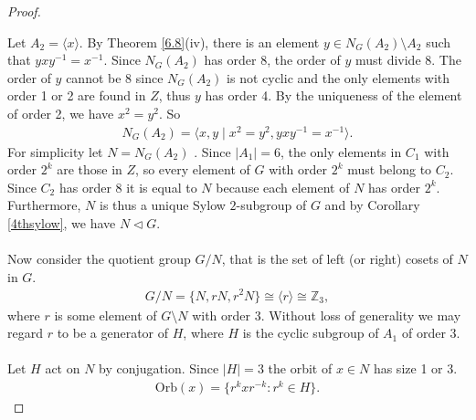 \documentclass[a4paper , 11pt]{book}
\theoremstyle{definition}
\theoremstyle{remark}
\begin{document}
\begin{proof}
\begin{center}
\end{center}

Let $A_2 = \langle x \rangle$. By Theorem \ref{6.8}(iv), there is an element $y \in N_G(A_2) \! \setminus \! A_2$ such that $y x y^{-1} = x^{-1}$. Since $N_G(A_2)$ has order 8, the order of $y$ must divide 8. The order of $y$ cannot be 8 since $N_G(A_2)$ is not cyclic and the only elements with order 1 or 2  are found in $Z$, thus $y$ has order 4. By the uniqueness of the element of order 2, we have $x^2 = y^2$. So
\begin{align*} N_G(A_2) = \langle x, y \; | \; x^2 = y^2, y x y^{-1} = x^{-1} \rangle.
\end{align*}
For simplicity let $N = N_G(A_2)$ . Since $|A_1| = 6$, the only elements in $C_1$ with order $2^k$ are those in $Z$, so every element of $G$ with order $2^k$ must belong to $C_2$. Since $C_2$ has order 8 it is equal to $N$ because each element of $N$ has order $2^k$. Furthermore, $N$ is thus a unique Sylow $2$-subgroup of $G$ and by Corollary \ref{4thsylow}, we have $N \vartriangleleft G$. \\
\\
Now consider the quotient group $G / N$, that is the set of left (or right) cosets of $N$ in $G$.
\begin {align*} G / N = \{ N, rN, r^2N \} \cong \langle r \rangle \cong \mathbb{Z}_3,
\end{align*}
where $r$ is some element of $G\! \setminus \! N$ with order 3. Without loss of generality we may regard $r$ to be a generator of $H$, where $H$ is the cyclic subgroup of $A_1$ of order 3. \\
\\
Let $H$ act on $N$ by conjugation. Since $|H| = 3$ the orbit of $x \in N$ has size 1 or 3.
\begin{align*} \text{Orb}(x) =  \{ r^k x r^{-k} : r^k \in H \}.
\end{align*}


\end{proof}
\end{document}
